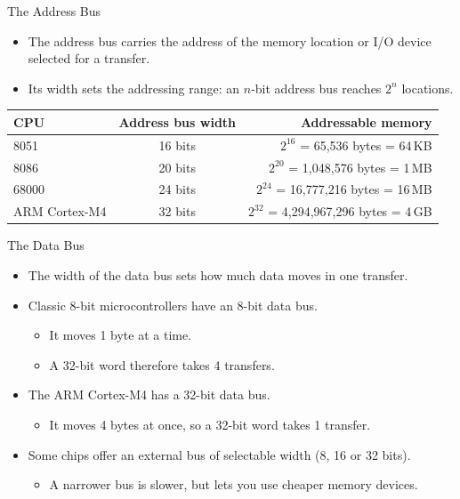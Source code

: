 \documentclass[9pt,aspectratio=169,xcolor=table]{beamer}
\begin{document}
\begin{frame}{The Address Bus}
    \begin{itemize}\itemsep4pt
        \item The address bus carries the address of the memory location
              or I/O device selected for a transfer.
        \item Its \alert{width} sets the addressing range: an $n$-bit
              address bus reaches $2^n$ locations.
    \end{itemize}

    \vspace{3mm}
    \begin{center}
    {\small
    \striped
    \begin{tabular}{@{}l c r@{}}
        \toprule
        \textbf{CPU} & \textbf{Address bus width} & \textbf{Addressable memory} \\
        \midrule
        8051   & 16 bits & $2^{16}$ = 65,536 bytes = 64\,KB \\
        8086   & 20 bits & $2^{20}$ = 1,048,576 bytes = 1\,MB \\
        68000  & 24 bits & $2^{24}$ = 16,777,216 bytes = 16\,MB \\
        ARM Cortex-M4 & 32 bits & $2^{32}$ = 4,294,967,296 bytes = \alert{4\,GB} \\
        \bottomrule
    \end{tabular}}
    \end{center}
\end{frame}

\begin{frame}{The Data Bus}
    \begin{itemize}\itemsep4pt
        \item The width of the data bus sets how much data moves in
              \alert{one transfer}.
        \item Classic 8-bit microcontrollers have an 8-bit data bus.
            \begin{itemize}
                \item It moves 1 byte at a time.
                \item A 32-bit word therefore takes 4 transfers.
            \end{itemize}
        \item The ARM Cortex-M4 has a 32-bit data bus.
            \begin{itemize}
                \item It moves 4 bytes at once, so a 32-bit word takes 1 transfer.
            \end{itemize}
        \item Some chips offer an external bus of selectable width
              (8, 16 or 32 bits).
            \begin{itemize}
                \item A narrower bus is slower, but lets you use cheaper memory devices.
            \end{itemize}
    \end{itemize}
\end{frame}
\end{document}
